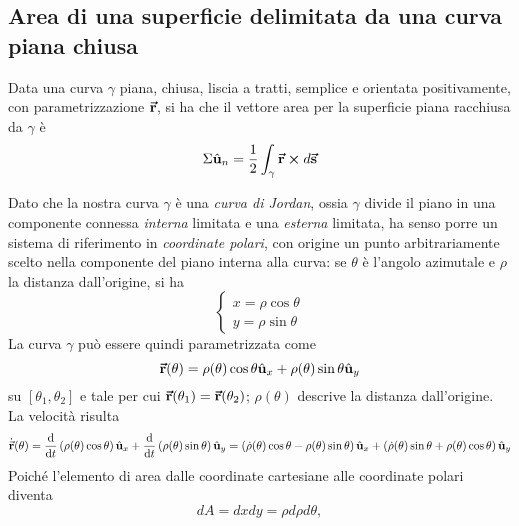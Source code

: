 \subsection{Area di una superficie delimitata da una curva piana chiusa}\label{AreaCurvaDelimitata}
\begin{lemming}
	Data una curva $\gamma$ piana, chiusa, liscia a tratti, semplice e orientata positivamente, con parametrizzazione $\vb*{\va{r}}$, si ha che il vettore area per la superficie piana racchiusa da $\gamma$ è
	\begin{equation}
		\Sigma\hat{\mathbf{u}}_n=\frac{1}{2}\int_{\gamma}\vb*{\va{r}}\cross d\vb*{\va{s}}
	\end{equation}
\end{lemming}
\begin{demonstration}
	Dato che la nostra curva $\gamma$ è una \textit{curva di Jordan}, ossia $\gamma$ divide il piano in una componente connessa \textit{interna} limitata e una \textit{esterna} limitata, ha senso porre un sistema di riferimento in \textit{coordinate polari}, con origine un punto arbitrariamente scelto nella componente del piano interna alla curva: se $\theta$ è l'angolo azimutale e $\rho$ la distanza dall'origine, si ha
	\begin{equation*}
		\begin{cases}
			x=\rho \cos\theta\\
			y=\rho \sin\theta
		\end{cases}
	\end{equation*}
	La curva $\gamma$ può essere quindi parametrizzata come 
	\begin{equation*}
		\vb*{\va{r}}(\theta)=\rho(\theta)\cos \theta\hat{\mathbf{u}}_x+\rho(\theta)\sin \theta\hat{\mathbf{u}}_y
	\end{equation*}
	su $\left[\theta_1,\theta_2\right]$ e tale per cui $\vb*{\va{r}}(\theta_1)=\vb*{\va{r}}(\theta_2)$; $\rho(\theta)$ descrive la distanza dall'origine. La velocità risulta
	\begin{equation*}
		\dot{\vec{\mathbf{r}}}(\theta)=\dv{t}\left(\rho(\theta)\cos \theta\right)\hat{\mathbf{u}}_x+\dv{t}\left(\rho(\theta)\sin \theta\right)\hat{\mathbf{u}}_y=\left(\dot{\rho}(\theta)\cos \theta-\rho(\theta)\sin \theta\right)\hat{\mathbf{u}}_x+\left(\dot{\rho}(\theta)\sin \theta+\rho(\theta)\cos \theta\right)\hat{\mathbf{u}}_y
	\end{equation*}
	Poiché l'elemento di area dalle coordinate cartesiane alle coordinate polari diventa
	\begin{equation*}
		dA=dxdy=\rho d\rho d\theta,
	\end{equation*}

\end{demonstration}
